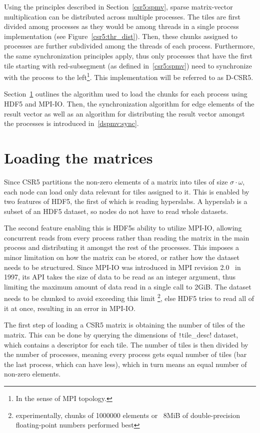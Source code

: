 \documentclass[thesis=M,english]{FITthesis}[2019/12/23]
\newcommand{\csre}[1]{\texttt!#1!}
\begin{document}
Using the principles described in Section~\ref{csr5:spmv}, sparse matrix-vector multiplication can be
distributed across multiple processes. The tiles are first divided among processes as they would be
among threads in a single process implementation (see Figure~\ref{csr5:thr_dist}). Then, these chunks
assigned to processes are further subdivided among the threads of each process. Furthermore, the same
synchronization principles apply, thus only processes that have the first tile starting with red-subsegment
(as defined in~\ref{csr5:spmv}) need to synchronize with the process to the
left\footnote{In the sense of MPI topology.}. This implementation will be referred to as D-CSR5.

Section~\ref{dspmv:load} outlines the algorithm used to load the chunks for each process using HDF5 and
MPI-IO. Then, the synchronization algorithm for edge elements of the result vector as well as an algorithm for
distributing the result vector amongst the processes is introduced in~\ref{dspmv:sync}.



\section{Loading the matrices}\label{dspmv:load}

Since CSR5 partitions the non-zero elements of a matrix into tiles of
size \(\sigma \cdot \omega\), each node can load only data relevant for tiles
assigned to it. This is enabled by two features of HDF5, the first of which
is reading hyperslabs. A hyperslab is a subset of an HDF5 dataset, so
nodes do not have to read whole datasets.

The second feature enabling this is HDF5s ability to utilize MPI-IO, allowing concurrent
reads from every process rather than reading the matrix in the main process
and distributing it amongst the rest of the processes. This imposes a minor limitation
on how the matrix can be stored, or rather how the dataset needs to be structured.
Since MPI-IO was introduced in MPI revision 2.0~\cite{mpi20} in 1997, its API takes
the size of data to be read as an integer argument, thus limiting the maximum amount of data read
in a single call to 2GiB. The dataset needs to be chunked to avoid exceeding this limit
\footnote{experimentally, chunks of 1000000 elements or ~8MiB of double-precision floating-point numbers performed best},
else HDF5 tries to read all of it at once, resulting in an error in MPI-IO.


The first step of loading a CSR5 matrix is obtaining the number of tiles of the matrix. This can be
done by querying the dimensions of \csre{tile_desc} dataset, which contains a descriptor for each tile.
The number of tiles is then divided by the number of processes, meaning every process gets equal
number of tiles (bar the last process, which can have less), which in turn means an equal number
of non-zero elements.
\end{document}
